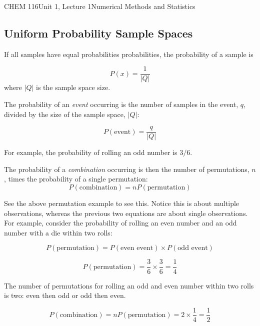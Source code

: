 \documentclass{article}
\begin{document}
\begin{tdoc}{CHEM 116}{Unit 1, Lecture 1}{Numerical Methods and Statistics}
\subsection{Uniform Probability Sample Spaces}

If all samples have equal probabilities probabilities, the probability of a
sample is

\begin{equation}
P(x) = \frac{1}{|Q|}
\end{equation}
where $|Q|$ is the sample space size.
\vspace{0.2cm}


The probability of an \emph{event} occurring is the number of samples
in the event, $q$, divided by the size of the sample space, $|Q|$:

\begin{equation}
P(\textrm{event}) = \frac{q}{|Q|}
\end{equation}

For example, the probability of rolling an odd number is $3 / 6$.


The probability of a \emph{combination} occurring is then the number of
permutations, $n$, times the probability of a single permutation:
\begin{equation}
P(\textrm{combination}) = n P(\textrm{permutation})
\end{equation}
\vspace{0.2cm}

See the above permutation example to see this. Notice this is about multiple observations, whereas the previous two equations are about single observations. For example, consider the probability of rolling an even number and an odd number with a die within two rolls:

\begin{equation}
P(\textrm{permutation}) = P(\textrm{even event}) \times P(\textrm{odd event})
\end{equation}

\begin{equation}
P(\textrm{permutation}) = \frac{3}{6} \times \frac{3}{6} = \frac{1}{4}
\end{equation}

The number of permutations for rolling an odd and even number within two rolls is two: even then odd or odd then even.

\begin{equation}
P(\textrm{combination}) = n P(\textrm{permutation}) = 2 \times \frac{1}{4} = \frac{1}{2}
\end{equation}


\end{tdoc}
\end{document}
